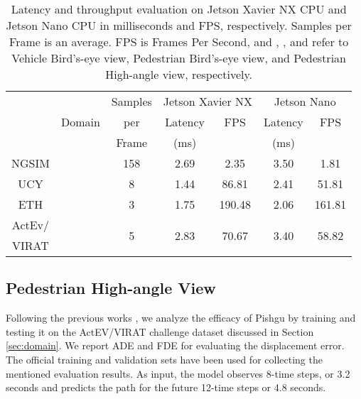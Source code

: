 \documentclass[sigconf]{acmart}
\begin{document}
\begin{table*}[b!]
\centering
\caption{Latency and throughput evaluation on Jetson Xavier NX CPU and  Jetson Nano CPU in milliseconds and FPS, respectively. Samples per Frame is an average. FPS is Frames Per Second, and , , and  refer to Vehicle Bird's-eye view, Pedestrian Bird's-eye view, and Pedestrian High-angle view, respectively.}
\vspace{-10pt}
\label{tab:latency}
\renewcommand{\arraystretch}{1.3}
\begin{adjustbox}{max width = \linewidth,center}
\begin{tabular}{c||c|c||c|c||c|c}
    \rowcolor{DarkGray}
    \cellcolor{Gray} & \cellcolor{Gray} & \cellcolor{Gray} Samples & \multicolumn{2}{c||}{\cellcolor{DarkGray}  Jetson Xavier NX}  & \multicolumn{2}{c}{\cellcolor{DarkGray}  Jetson Nano} \\ \cline{4-7} 
    \rowcolor{Gray}
     & Domain & per   & Latency & FPS & Latency & FPS \\
    \rowcolor{Gray}
     &        & Frame & (ms)    &     & (ms)    &     \\ \hline \hline
NGSIM \cite{NGSIM_i80, NGSIM_US101}     &   & 158 & 2.69  & 2.35   & 3.50  & 1.81   \\ \hline
UCY \cite{pellegrini2009you}            &   & 8   & 1.44  & 86.81  & 2.41  & 51.81  \\ \hline
ETH \cite{lerner2007crowds}             &   & 3   & 1.75  & 190.48 & 2.06  & 161.81 \\ \hline
ActEv/                                  & \multirow{2}{*}{}  & \multirow{2}{*}{5}   & \multirow{2}{*}{2.83}  & \multirow{2}{*}{70.67}  & \multirow{2}{*}{3.40}   & \multirow{2}{*}{58.82}  \\
VIRAT \cite{awad2018benchmarking}       &        &     &       &        &       &        \\
\end{tabular}
\end{adjustbox}
\vspace{-10pt}
\end{table*}


\subsection{Pedestrian High-angle View}

Following the previous works \cite{liang2019peeking, liang2020garden, liang2020simaug, li2022graph}, we analyze the efficacy of Pishgu by training and testing it on the ActEV/VIRAT \cite{awad2018benchmarking} challenge dataset discussed in Section \ref{sec:domain}. We report ADE and FDE for evaluating the displacement error. The official training and validation sets have been used for collecting the mentioned evaluation results. As input, the model observes 8-time steps, or 3.2 seconds and predicts the path for the future 12-time steps or 4.8 seconds.
\end{document}
